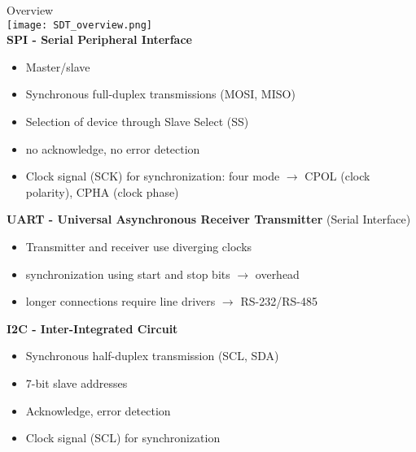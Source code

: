 \begin{concept}{Overview}\\
    \texttt{[image: SDT\_overview.png]}
    \vspace{2mm}\\
    \textbf{SPI - Serial Peripheral Interface}
    \begin{itemize}
        \item Master/slave
        \item Synchronous full-duplex transmissions (MOSI, MISO)
        \item Selection of device through Slave Select (SS)
        \item no acknowledge, no error detection
        \item Clock signal (SCK) for synchronization: four mode $\rightarrow$ CPOL (clock polarity), CPHA (clock phase)
    \end{itemize}
    \vspace{2mm}

    \textbf{UART - Universal Asynchronous Receiver Transmitter} (Serial Interface)
    \begin{itemize}
        \item Transmitter and receiver use diverging clocks
        \item synchronization using start and stop bits $\rightarrow$ overhead
        \item longer connections require line drivers $\rightarrow$ RS-232/RS-485
    \end{itemize}
    \vspace{2mm}

    \textbf{I2C - Inter-Integrated Circuit}
    \begin{itemize}
        \item Synchronous half-duplex transmission (SCL, SDA)
        \item 7-bit slave addresses
        \item Acknowledge, error detection
        \item Clock signal (SCL) for synchronization
    \end{itemize}
\end{concept}

